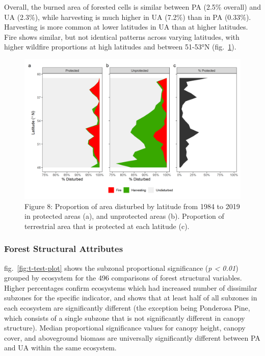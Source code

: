 \documentclass[10pt,oneside]{article}
\makeatletter
\def\maxwidth{\ifdim\Gin@nat@width>\linewidth\linewidth
\else\Gin@nat@width\fi}
\let\Oldincludegraphics\includegraphics
\renewcommand{\includegraphics}[1]{\Oldincludegraphics[width=\maxwidth]{#1}}
\makeatother
\begin{document}
Overall, the burned area of forested cells is similar between PA (2.5\%
overall) and UA (2.3\%), while harvesting is much higher in UA (7.2\%)
than in PA (0.33\%). Harvesting is more common at lower latitudes in UA
than at higher latitudes. Fire shows similar, but not identical patterns
across varying latitudes, with higher wildfire proportions at high
latitudes and between 51-53°N (fig.~\ref{fig:lat-dist}).

\begin{figure}
\hypertarget{fig:lat-dist}{%
\centering
\includegraphics{figures/latitude_disturbance_plot.png}
\caption{Figure 8: Proportion of area disturbed by latitude from 1984 to
2019 in protected areas (a), and unprotected areas (b). Proportion of
terrestrial area that is protected at each latitude
(c).}\label{fig:lat-dist}
}
\end{figure}

\hypertarget{forest-structural-attributes-1}{%
\subsubsection{Forest Structural
Attributes}\label{forest-structural-attributes-1}}

fig.~\ref{fig:t-test-plot} shows the subzonal proportional significance
(\emph{p \textless{} 0.01}) grouped by ecosystem for the 496 comparisons
of forest structural variables. Higher percentages confirm ecosystems
which had increased number of dissimilar subzones for the specific
indicator, and shows that at least half of all subzones in each
ecosystem are significantly different (the exception being Ponderosa
Pine, which consists of a single subzone that is not significantly
different in canopy structure). Median proportional significance values
for canopy height, canopy cover, and aboveground biomass are universally
significantly different between PA and UA within the same ecosystem.
\end{document}

